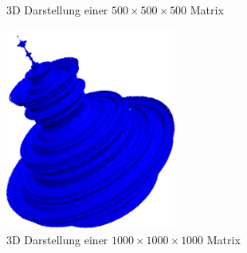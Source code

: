 \begin{refsection}
\begin{figure}[ht!]
			\caption{3D Darstellung einer $500\times500\times 500$ Matrix}
			\label{fig. mandelbrot500}
		\end{figure}
		\begin{figure}[ht!]\centering
			\includegraphics[width=0.5\textwidth]{apfel/pic/v2_1000.png}
			\caption{3D Darstellung einer $1000\times1000\times 1000$ Matrix}
			\label{fig. mandelbrot1000}
		\end{figure}
\FloatBarrier

\end{refsection}
